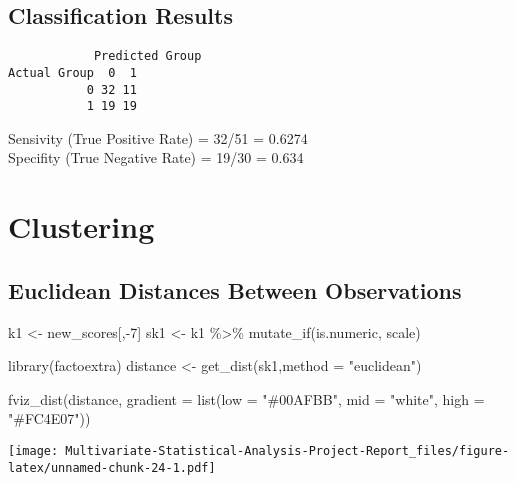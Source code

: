 \documentclass[12pt,twoside]{deuthesis}
\newenvironment{Shaded}{\begin{snugshade}}{\end{snugshade}}
\newcommand{\AttributeTok}[1]{\textcolor[rgb]{0.77,0.63,0.00}{#1}}
\newcommand{\DecValTok}[1]{\textcolor[rgb]{0.00,0.00,0.81}{#1}}
\newcommand{\FunctionTok}[1]{\textcolor[rgb]{0.00,0.00,0.00}{#1}}
\newcommand{\NormalTok}[1]{#1}
\newcommand{\OtherTok}[1]{\textcolor[rgb]{0.56,0.35,0.01}{#1}}
\newcommand{\SpecialCharTok}[1]{\textcolor[rgb]{0.00,0.00,0.00}{#1}}
\newcommand{\StringTok}[1]{\textcolor[rgb]{0.31,0.60,0.02}{#1}}
\begin{document}
\hypertarget{classification-results}{%
\subsection{Classification Results}\label{classification-results}}
\begin{Shaded}
\end{Shaded}
\begin{verbatim}
            Predicted Group
Actual Group  0  1
           0 32 11
           1 19 19
\end{verbatim}
Sensivity (True Positive Rate) = 32/51 = 0.6274\\
\setlength{\parindent}{0in}
Specifity (True Negative Rate) = 19/30 = 0.634

\hypertarget{clustering}{%
\section{Clustering}\label{clustering}}

\hypertarget{euclidean-distances-between-observations}{%
\subsection{Euclidean Distances Between Observations}\label{euclidean-distances-between-observations}}
\begin{Shaded}
\begin{Highlighting}[]
\NormalTok{k1 }\OtherTok{\textless{}{-}}\NormalTok{ new\_scores[,}\SpecialCharTok{{-}}\DecValTok{7}\NormalTok{]}
\NormalTok{sk1 }\OtherTok{\textless{}{-}}\NormalTok{ k1 }\SpecialCharTok{\%\textgreater{}\%} \FunctionTok{mutate\_if}\NormalTok{(is.numeric, scale)}

\FunctionTok{library}\NormalTok{(factoextra)}
\NormalTok{distance }\OtherTok{\textless{}{-}} \FunctionTok{get\_dist}\NormalTok{(sk1,}\AttributeTok{method =} \StringTok{"euclidean"}\NormalTok{)}

\FunctionTok{fviz\_dist}\NormalTok{(distance, }\AttributeTok{gradient =} \FunctionTok{list}\NormalTok{(}\AttributeTok{low =} \StringTok{"\#00AFBB"}\NormalTok{, }\AttributeTok{mid =} \StringTok{"white"}\NormalTok{, }\AttributeTok{high =} \StringTok{"\#FC4E07"}\NormalTok{))}
\end{Highlighting}
\end{Shaded}
\texttt{[image: Multivariate-Statistical-Analysis-Project-Report\_files/figure-latex/unnamed-chunk-24-1.pdf]}\\
\setlength{\parindent}{0in}
\end{document}

